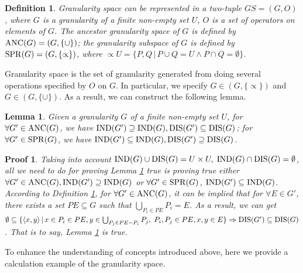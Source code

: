 \documentclass[review]{elsarticle}
\newtheorem{myDef}{Definition}
\newtheorem{myLem}{Lemma}
\newtheorem*{myPrf}{Proof}
\begin{document}
		\begin{myDef}\label{gspace}
			Granularity space can be represented in a two-tuple $GS=(G,O)$, where $G$ is a granularity of a finite non-empty set $U$, $O$ is a set of operators on elements of $G$. The ancestor granularity space of $G$ is defined by ${\rm ANC}(G)=(G,\{\cup\})$; the granularity subspace of $G$ is defined by ${\rm SPR}(G)=(G,\{\propto\})$, where $\propto U=\{P,Q\,|\,P\cup Q=U \wedge P \cap Q= \emptyset\}$.
		\end{myDef}
		\noindent Granularity space is the set of granularity generated from doing several operations specified by $O$ on $G$. In particular, we specify $G \in (G,\{\propto\})$ and $G \in (G,\{\cup\})$. As a result, we can construct the following lemma.
		\begin{myLem}\label{bAK}
			Given a granularity $G$ of a finite non-empty set $U$, for $\forall G' \in {\rm ANC}(G)$, we have ${\rm IND}(G') \supseteq {\rm IND}(G),{\rm DIS}(G') \subseteq {\rm DIS}(G)$; for $\forall G' \in {\rm SPR}(G)$, we have ${\rm IND}(G') \subseteq {\rm IND}(G),{\rm DIS}(G') \supseteq {\rm DIS}(G)$.
		\end{myLem}
		\begin{myPrf}
			Taking into account ${\rm IND}(G) \cup {\rm DIS}(G) = U \times U,\;{\rm IND}(G) \cap {\rm DIS}(G)=\emptyset$, all we need to do for proving Lemma \ref{bAK} true is proving true either $\forall G' \in {\rm ANC}(G), {\rm IND}(G') \supseteq {\rm IND}(G)$ or $\forall G' \in {\rm SPR}(G)$, ${\rm IND}(G') \subseteq {\rm IND}(G)$. According to Definition \ref{gspace}, for $\forall G' \in {\rm ANC}(G)$, it can be implied that for $\forall E \in G'$, there exists a set $PE \subseteq G$ such that $\bigcup_{P_i \in PE}P_i=E$. As a result, we can get $\emptyset \subseteq \{\langle x,y\rangle \,|\, x \in P_i \in PE, y \in \bigcup_{P_j \in PE-P_i}P_j,\;P_i,P_j \in PE,x,y\in E\} \Rightarrow {\rm DIS}(G') \subseteq {\rm DIS}(G)$. That is to say, Lemma \ref{bAK} is true.
		\end{myPrf}
		\noindent To enhance the understanding of concepts introduced above, here we provide a calculation example of the granularity space.
		
\end{document}
